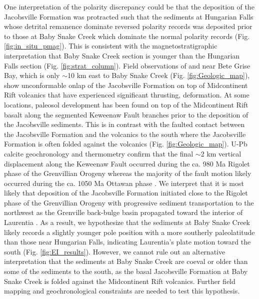 \documentclass[draft]{agujournal2019}
\begin{document}
One interpretation of the polarity discrepancy could be that the deposition of the Jacobsville Formation was protracted such that the sediments at Hungarian Falls whose detrital remanence dominate reversed polarity records was deposited prior to those at Baby Snake Creek which dominate the normal polarity records (Fig. \ref{fig:in_situ_pmag}). This is consistent with the magnetostratigraphic interpretation that Baby Snake Creek section is younger than the Hungarian Falls section (Fig. \ref{fig:strat_column}). Field observations of  and  near Bete Grise Bay, which is only $\sim$10 km east to Baby Snake Creek (Fig. \ref{fig:Geologic_map}), show unconformable onlap of the Jacobsville Formation on top of Midcontinent Rift volcanics that have experienced significant thrusting, deformation. At some locations, paleosol development has been found on top of the Midcontinent Rift basalt along the segmented Keweenaw Fault branches prior to the deposition of the Jacobsville sediments. This is in contrast with the faulted contact between the Jacobsville Formation and the volcanics to the south where the Jacobsville Formation is often folded against the volcanics (Fig. \ref{fig:Geologic_map}). U-Pb calcite geochronology and thermometry confirm that the final $\sim$2 km vertical displacement along the Keweenaw Fault occurred during the ca. 980 Ma Rigolet phase of the Grenvillian Orogeny whereas the majority of the fault motion likely occurred during the ca. 1050 Ma Ottawan phase \cite{Hodgin2022b}. We interpret that it is most likely that deposition of the Jacobsville Formation initiated close to the Rigolet phase of the Grenvillian Orogeny with progressive sediment transportation to the northwest as the Grenville back-bulge basin propagated toward the interior of Laurentia \cite{Hodgin2022b}. As a result, we hypothesize that the sediments at Baby Snake Creek likely records a slightly younger pole position with a more southerly paleolatitude than those near Hungarian Falls, indicating Laurentia's plate motion toward the south (Fig. \ref{fig:EI_results}). However, we cannot rule out an alternative interpretation that the sediments at Baby Snake Creek are coeval or older than some of the sediments to the south, as the basal Jacobsville Formation at Baby Snake Creek is folded against the Midcontinent Rift volcanics. Further field mapping and geochronological constraints are needed to test this hypothesis. 
\end{document}

